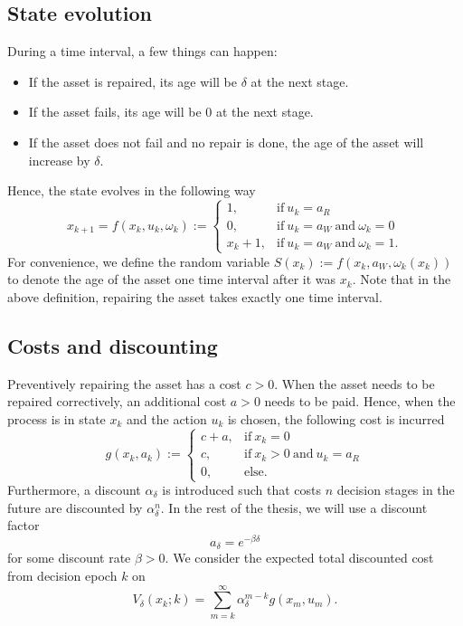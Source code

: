 \documentclass[a4paper]{thesis}
\theoremstyle{definition}
\begin{document}
\subsection{State evolution}
During a time interval, a few things can happen:
\begin{itemize}
	\item If the asset is repaired, its age will be $\delta$ at the next stage.
	\item If the asset fails, its age will be $0$ at the next stage.
	\item If the asset does not fail and no repair is done, the age of the asset will increase by $\delta$.
\end{itemize}
Hence, the state evolves in the following way
$$
x_{k+1}=f(x_k,u_k,\omega_k):=\begin{cases}
1,&\text{if}\ u_k=a_R \\
0,&\text{if}\ u_k=a_W\ \text{and}\ \omega_k=0 \\
x_k+1,&\text{if}\ u_k=a_W\ \text{and}\ \omega_k=1.
\end{cases}
$$
For convenience, we define the random variable $S(x_k):=f(x_k,a_W,\omega_k(x_k))$ to denote the age of the asset one time interval after it was $x_k$.
Note that in the above definition, repairing the asset takes exactly one time interval.

\subsection{Costs and discounting}
Preventively repairing the asset has a cost $c>0$.
When the asset needs to be repaired correctively, an additional cost $a>0$ needs to be paid.
Hence, when the process is in state $x_k$ and the action $u_k$ is chosen, the following cost is incurred
$$
g(x_k,a_k):=\begin{cases}
c+a,&\text{if}\ x_k=0 \\
c,&\text{if}\ x_k>0\ \text{and}\ u_k=a_R \\
0,&\text{else}.
\end{cases}
$$
Furthermore, a discount $\alpha_\delta$ is introduced such that costs $n$ decision stages in the future are discounted by $\alpha_\delta^n$.
In the rest of the thesis, we will use a discount factor
$$
a_\delta=e^{-\beta\delta}
$$
for some discount rate $\beta>0$.
We consider the expected total discounted cost from decision epoch $k$ on
$$
V_\delta(x_k;k)=\sum\limits_{m=k}^\infty \alpha_\delta^{m-k}g(x_m,u_m).
$$
\end{document}
